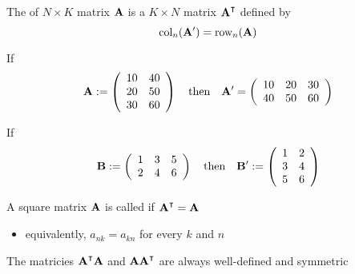 \begin{frame}
    
    \vspace{2em}
    The  of $N \times K$ matrix $\mathbf A$ is a $K
    \times N$ matrix $\boldA^\T$ defined by 
    $$\operatorname{col}_n(\mathbf A') = \operatorname{row}_n(\mathbf A)$$

    \Eg If
    \begin{equation*}
        \label{eq:aandb}
        \mathbf A := 
        \left(
        \begin{array}{cc}
            10 & 40  \\
            20 & 50  \\
            30 & 60
        \end{array}
        \right)
        \quad \text{then} \quad
        \mathbf A' = 
        \left(
        \begin{array}{ccc}
            10 & 20 & 30 \\
            40 & 50 & 60 
        \end{array}
        \right)
    \end{equation*}

    If
    \begin{equation*}
        \mathbf B := 
        \left(
        \begin{array}{ccc}
            1 & 3 & 5 \\
            2 & 4 & 6 \\
        \end{array}
        \right)
        \quad \text{then} \quad
        \mathbf B' := 
        \left(
        \begin{array}{cc}
            1 & 2  \\
            3 & 4  \\
            5 & 6 
        \end{array}
        \right)
    \end{equation*}

\end{frame}

\begin{frame}

    \vspace{2em}
    A square matrix $\mathbf A$ is called  if $\boldA^\T = \boldA$
    \begin{itemize}
        \item equivalently, $a_{nk} = a_{kn}$ for every $k$ and $n$
    \end{itemize}
    
    \vspace{.7em}
    The matricies $\boldA^\T
    \boldA$ and $\boldA \boldA^\T$ are always well-defined and symmetric
    
\end{frame}

